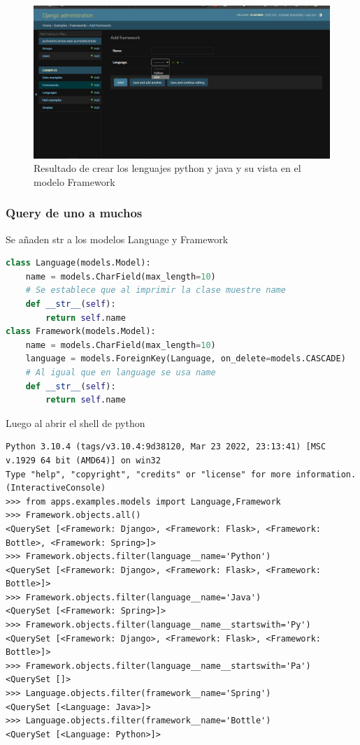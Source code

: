 \documentclass{article}
\begin{document}
\begin{figure}[h]
    \centering
    \includegraphics{img/1.jpg}
    \caption{Resultado de crear los lenguajes python y java y su vista en el modelo Framework}
    \label{fig:enter-label}
\end{figure}


\subsubsection{Query de uno a muchos}
Se añaden str a los modelos Language y Framework

\begin{lstlisting}[language=Python, caption=definir str]
class Language(models.Model):
    name = models.CharField(max_length=10)
    # Se establece que al imprimir la clase muestre name 
    def __str__(self):
        return self.name
class Framework(models.Model):
    name = models.CharField(max_length=10)
    language = models.ForeignKey(Language, on_delete=models.CASCADE)
    # Al igual que en language se usa name
    def __str__(self):
        return self.name
\end{lstlisting}

Luego al abrir el shell de python 
\begin{lstlisting}
Python 3.10.4 (tags/v3.10.4:9d38120, Mar 23 2022, 23:13:41) [MSC v.1929 64 bit (AMD64)] on win32
Type "help", "copyright", "credits" or "license" for more information.
(InteractiveConsole)
>>> from apps.examples.models import Language,Framework
>>> Framework.objects.all()   
<QuerySet [<Framework: Django>, <Framework: Flask>, <Framework: Bottle>, <Framework: Spring>]>
>>> Framework.objects.filter(language__name='Python') 
<QuerySet [<Framework: Django>, <Framework: Flask>, <Framework: Bottle>]>
>>> Framework.objects.filter(language__name='Java')   
<QuerySet [<Framework: Spring>]>
>>> Framework.objects.filter(language__name__startswith='Py') 
<QuerySet [<Framework: Django>, <Framework: Flask>, <Framework: Bottle>]>
>>> Framework.objects.filter(language__name__startswith='Pa') 
<QuerySet []>
>>> Language.objects.filter(framework__name='Spring') 
<QuerySet [<Language: Java>]>
>>> Language.objects.filter(framework__name='Bottle') 
<QuerySet [<Language: Python>]>
\end{lstlisting}
\end{document}

